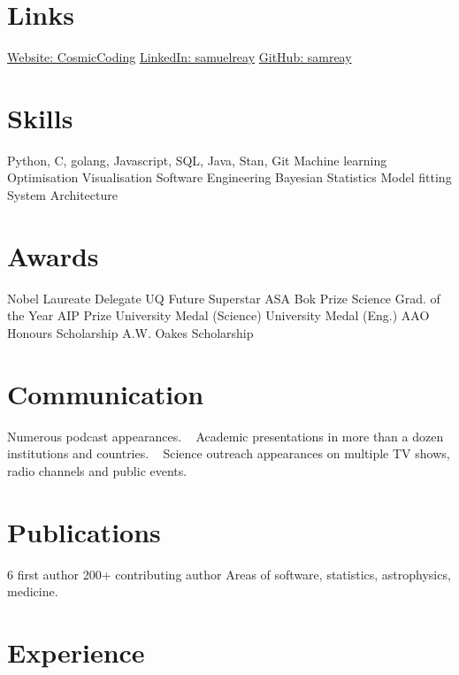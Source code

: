 \documentclass[]{friggeri-cv2}
\begin{document}
\pagestyle{plain}



\begin{aside}
\section{Links}
\href{https://cosmiccoding.com.au}{Website: CosmicCoding}
\href{https://www.linkedin.com/in/samuelreay/}{LinkedIn: samuelreay}
\href{https://github.com/samreay}{GitHub: samreay}
\section{Skills}
Python, C, golang, Javascript, SQL, Java, Stan, Git
Machine learning
Optimisation
Visualisation
Software Engineering
Bayesian Statistics
Model fitting
System Architecture
\section{Awards}
Nobel Laureate Delegate
UQ Future Superstar
ASA Bok Prize
Science Grad. of the Year
AIP Prize
University Medal (Science)
University Medal (Eng.)
AAO Honours Scholarship
A.W. Oakes Scholarship
\section{Communication}
Numerous podcast appearances.
~
Academic presentations in more than a dozen institutions and countries.
~
Science outreach appearances on multiple TV shows, radio channels and public events.
\section{Publications}
6 first author
200+ contributing author
Areas of software, statistics, astrophysics, medicine.
\end{aside}


\section{Experience}
\end{document}
